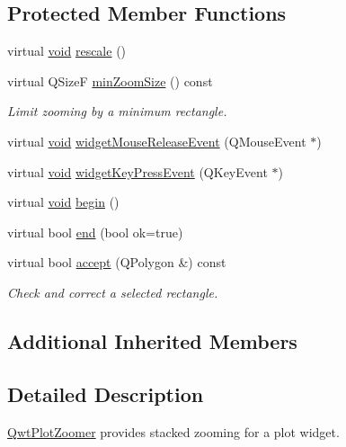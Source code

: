 \subsection*{Protected Member Functions}
\begin{DoxyCompactItemize}
\item 
virtual \hyperlink{group___u_a_v_objects_plugin_ga444cf2ff3f0ecbe028adce838d373f5c}{void} \hyperlink{class_qwt_plot_zoomer_a0d0f90bbd5fe99d5231b3cee00fffabe}{rescale} ()
\item 
virtual Q\-Size\-F \hyperlink{class_qwt_plot_zoomer_aca5523ed1676ca733fdaf7484a8b4499}{min\-Zoom\-Size} () const 
\begin{DoxyCompactList}\small\item\em Limit zooming by a minimum rectangle. \end{DoxyCompactList}\item 
virtual \hyperlink{group___u_a_v_objects_plugin_ga444cf2ff3f0ecbe028adce838d373f5c}{void} \hyperlink{class_qwt_plot_zoomer_aabded662ecb3555b3a29cf3daacf79de}{widget\-Mouse\-Release\-Event} (Q\-Mouse\-Event $\ast$)
\item 
virtual \hyperlink{group___u_a_v_objects_plugin_ga444cf2ff3f0ecbe028adce838d373f5c}{void} \hyperlink{class_qwt_plot_zoomer_aa44e42dcf37547a6b93d04a593f140c6}{widget\-Key\-Press\-Event} (Q\-Key\-Event $\ast$)
\item 
virtual \hyperlink{group___u_a_v_objects_plugin_ga444cf2ff3f0ecbe028adce838d373f5c}{void} \hyperlink{class_qwt_plot_zoomer_aa54bb05797c0468c0f8de4217dce24dd}{begin} ()
\item 
virtual bool \hyperlink{class_qwt_plot_zoomer_ac7d10eb27858ccfebebecab5d69ecbb3}{end} (bool ok=true)
\item 
virtual bool \hyperlink{class_qwt_plot_zoomer_afe2a439f5085602e97c403d451561dd5}{accept} (Q\-Polygon \&) const 
\begin{DoxyCompactList}\small\item\em Check and correct a selected rectangle. \end{DoxyCompactList}\end{DoxyCompactItemize}
\subsection*{Additional Inherited Members}


\subsection{Detailed Description}
\hyperlink{class_qwt_plot_zoomer}{Qwt\-Plot\-Zoomer} provides stacked zooming for a plot widget. 

